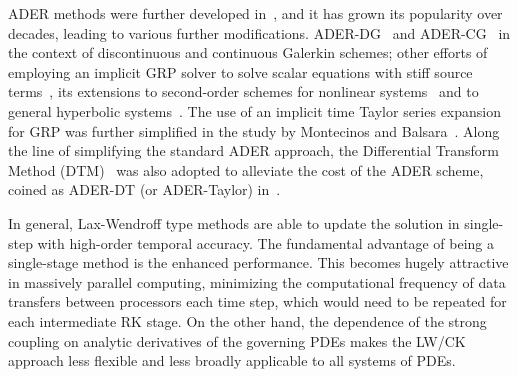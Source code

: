 ADER methods were further developed in~\cite{toro2001towards,titarev2002ader,titarev2005ader},
and it has grown its popularity over decades,
leading to various further modifications.
ADER-DG~\cite{fambri2017space,zanotti2016efficient} and
ADER-CG~\cite{balsara2009efficient,balsara2013efficient,balsara2017higher}
in the context of discontinuous and continuous Galerkin schemes;
other efforts of employing
an implicit GRP solver
to solve  scalar equations 
with stiff source terms~\cite{montecinos2012solver},
its extensions to second-order schemes for 
nonlinear systems~\cite{montecinos2014reformulations}
and to general hyperbolic systems~\cite{toro2015implicit}.
The use of an implicit time Taylor series expansion for GRP
was further simplified
in the study by Montecinos and Balsara~\cite{montecinos2020simplified}.
Along the line of simplifying the standard ADER approach,
the Differential Transform Method (DTM)~\cite{chen1996application}
was also adopted to alleviate
the cost of the ADER scheme, coined as ADER-DT (or ADER-Taylor)
in~\cite{norman2012multi,norman2013algorithmic,norman2014weno}.

In general, Lax-Wendroff type methods are able to update the solution
in single-step with high-order temporal accuracy.
The fundamental advantage of being a single-stage method is the enhanced performance.
This becomes hugely attractive in massively parallel computing, minimizing the computational frequency
of data transfers between processors each time step, which would need to be repeated for each intermediate RK stage.
On the other hand, the dependence of the strong coupling on analytic derivatives
of the governing PDEs makes the LW/CK approach less flexible and less broadly applicable to all systems of PDEs.
